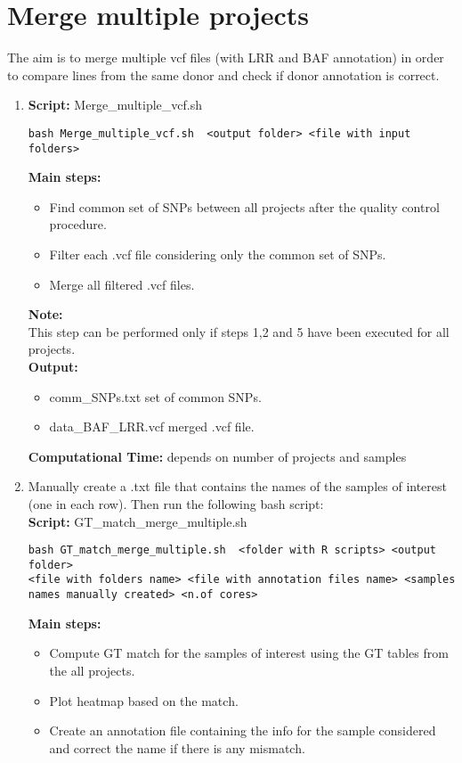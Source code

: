 \documentclass[11pt]{paper}
\begin{document}
\section{Merge multiple projects}
The aim is to merge multiple vcf files (with LRR and BAF annotation) in order to compare lines from the same donor and check if donor annotation is correct.
\begin{enumerate}
\item \textbf{Script:} Merge\_multiple\_vcf.sh
\begin{verbatim}
bash Merge_multiple_vcf.sh  <output folder> <file with input folders>
\end{verbatim}
\textbf{Main steps:}
\begin{itemize}
\item Find common set of SNPs between all projects after the quality control procedure.
\item Filter each .vcf file considering only the common set of SNPs.
\item Merge all filtered .vcf files.
\end{itemize}
\textbf{Note:}\\
This step can be performed only if steps 1,2 and 5 have been executed for all projects.\\
\textbf{Output:}
\begin{itemize}
\item comm\_SNPs.txt set of common SNPs.
\item data\_BAF\_LRR.vcf merged .vcf file.
\end{itemize}
\textbf{Computational Time:} depends on number of projects and samples
\item Manually create a .txt file that contains the names of the samples of interest (one in each row). Then run the following bash script:\\
\textbf{Script:} GT\_match\_merge\_multiple.sh
\begin{verbatim}
bash GT_match_merge_multiple.sh  <folder with R scripts> <output folder> 
<file with folders name> <file with annotation files name> <samples names manually created> <n.of cores>
\end{verbatim}
\textbf{Main steps:}
\begin{itemize}
\item Compute GT match for the samples of interest using the GT tables from the all projects.
\item Plot heatmap based on the match.
\item Create an annotation file containing the info for the sample considered and correct the name if there is any mismatch.

\end{itemize}
\end{enumerate}
\end{document}
